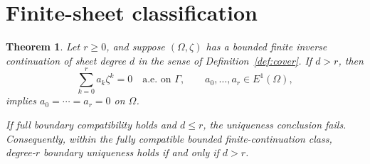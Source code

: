 \documentclass[11pt]{article}
\newtheorem{theorem}{Theorem}
\begin{document}
\section{Finite-sheet classification}

\begin{theorem}\label{thm:classification}
Let $r\ge0$, and suppose $(\Omega,\zeta)$ has a bounded finite inverse
continuation of sheet degree $d$ in the sense of Definition~\ref{def:cover}.
If $d>r$, then
\begin{equation}\label{eq:relation-r}
 \sum_{k=0}^{r}a_k\zeta^k=0\quad\text{a.e. on }\Gamma,
 \qquad a_0,\ldots,a_r\in E^1(\Omega),
\end{equation}
implies $a_0=\cdots=a_r=0$ on $\Omega$.

If full boundary compatibility holds and $d\le r$, the uniqueness conclusion
fails.  Consequently, within the fully compatible bounded finite-continuation
class, degree-$r$ boundary uniqueness holds if and only if $d>r$.
\end{theorem}
\end{document}
